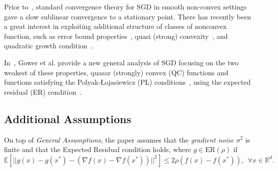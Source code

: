 \documentclass{article}
\begin{document}
Prior to~\cite{https://doi.org/10.48550/arxiv.2006.10311}, standard convergence theory for SGD in smooth non-convex settings gave a slow sublinear convergence to a stationary point. There has recently been a great interest
in exploiting additional structure of classes of nonconvex function, such as error bound properties~\cite{Fabian2010ErrorBN},
quasi (strong) convexity~\cite{https://doi.org/10.48550/arxiv.1906.11985, JMLR:v19:16-465, https://doi.org/10.48550/arxiv.1710.00797}, and quadratic growth condition~\cite{doi:10.1137/S1052623499359178}.

In~\cite{https://doi.org/10.48550/arxiv.2006.10311}, Gower et al. provide a new general analysis of SGD focusing on the two weakest of these properties, quasar (strongly) convex (QC) functions and functions satisfying the
Polyak-Łojasiewicz (PL) conditions~\cite{POLYAK1963864}, using the expected residual (ER) condition~\cite{Gower2021StochasticQM}.

\subsection{Additional Assumptions}
On top of \textit{General Assumptions}, the paper assumes that the \textit{gradient noise} $\sigma^2$ is finite and that the Expected Residual condition holds, where $g\in\text{ER}(\rho)$ if
\begin{equation}
	\label{eq31}
	\mathbb{E}\left[||g(x) - g(x^*) - (\nabla f(x) - \nabla f(x^*))||^2\right] \leq 2\rho (f(x) - f(x^*)), \ \ \forall x\in\mathbb{R}^d.
\end{equation}
\end{document}
